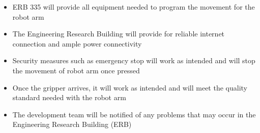 \begin{itemize}
  \item ERB 335 will provide all equipment needed to program the movement for the robot arm
  \item The Engineering Research Building will provide for reliable internet connection and ample power connectivity
  \item Security measures such as emergency stop will work as intended and will stop the movement of robot arm once pressed
  \item Once the gripper arrives, it will work as intended and will meet the quality standard needed with the robot arm
  \item The development team will be notified of any problems that may occur in the Engineering Research Building (ERB)
\end{itemize}

